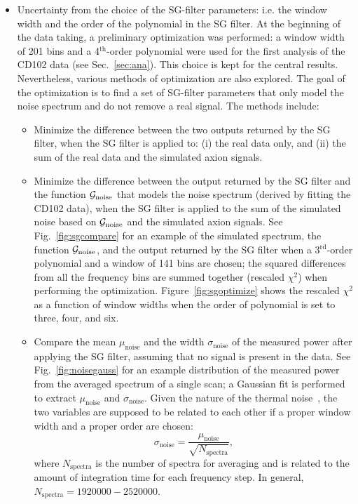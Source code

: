 \documentclass[%
reprint, %
superscriptaddress,
 amsmath,amssymb,
 aps
]{revtex4-2}
\begin{document}
\begin{itemize}
\item Uncertainty from the choice of the SG-filter parameters: i.e.  
the window width and the order of the polynomial in the SG filter. At the 
beginning of the data taking, a preliminary optimization was performed: a 
window width of 201 bins and a 4$^\text{th}$-order polynomial were used for 
the first analysis of the CD102 data (see Sec.~\ref{sec:ana}). 
This choice is kept for the central results. 
Nevertheless, various methods of optimization are also explored. The goal 
of the optimization is to find a set of SG-filter parameters that only 
model the noise spectrum and do not remove a real signal. 
The methods include:
\begin{itemize}
 \item Minimize the difference between the two outputs returned by the SG 
filter, when the SG filter is applied to: (i) the real data only, and (ii) 
the sum of the real data and the simulated axion signals. 
 \item Minimize the difference between the output returned by the 
 SG filter and the function ${\cal G}_\text{noise}$ 
that models the noise spectrum (derived by fitting the CD102 data), 
when the SG filter is applied to the sum of the simulated noise based on 
${\cal G}_\text{noise}$ and the simulated axion signals. 
See Fig.~\ref{fig:sgcompare} for an example of the 
simulated spectrum, the function ${\cal G}_\text{noise}$, and the 
output returned by 
 the SG filter when a 3$^\text{rd}$-order polynomial and a window of 141 
 bins are chosen; the squared differences from all the frequency bins are 
summed together (rescaled $\chi^2$) when performing the optimization.
 Figure~\ref{fig:sgoptimize} shows the rescaled $\chi^2$ 
as a function of window widths when the order of polynomial is 
 set to three, four, and six. 
 \item Compare the mean $\mu_\text{noise}$ and the width $\sigma_\text{noise}$ 
of the measured power after applying the SG filter, 
assuming that no signal is present in the 
data. See Fig.~\ref{fig:noisegauss} for an example distribution 
of the measured power from the averaged spectrum of a 
single scan; a Gaussian fit is performed to extract 
$\mu_\text{noise}$ and $\sigma_\text{noise}$. Given the nature of the 
thermal noise~\cite{Dicke}, the two variables are supposed to be related to 
each other if a proper window width and a proper order are chosen:
\begin{equation*} 
\sigma_\text{noise} = \frac{\mu_\text{noise}}{\sqrt{N_\text{spectra}}},
\end{equation*}
where $N_\text{spectra}$ is the number of spectra for averaging and 
is related to the amount of integration time for each frequency step. In 
general, $N_\text{spectra}=1920000-2520000$. 
\end{itemize}


\end{itemize}
\end{document}
